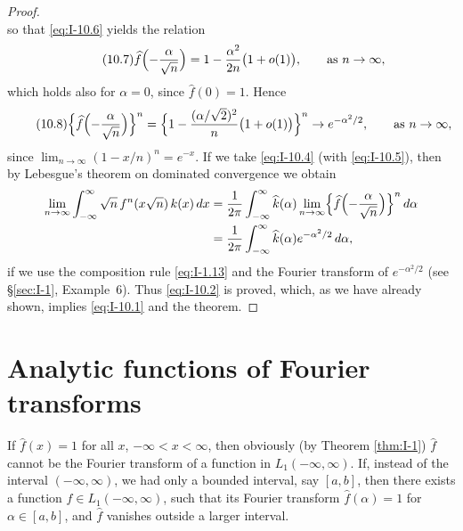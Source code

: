 \begin{proof}
\begin{equation*}
\end{equation*}
so that \eqref{eq:I-10.6} yields the relation
\begin{equation}\label{eq:I-10.7}\tag{10.7}
\widehat f\Bigl(-\frac{\alpha}{\sqrt n}\Bigr)
=1-\frac{\alpha^{2}}{2n}\bigl(1+o(1)\bigr),\qquad\text{as }n\to\infty,
\end{equation}
which holds also for $\alpha=0$, since $\widehat f(0)=1$. Hence
\begin{equation}\label{eq:I-10.8}\tag{10.8}
\Bigl\{\widehat f\Bigl(-\frac{\alpha}{\sqrt n}\Bigr)\Bigr\}^n
=\Bigl\{1-\frac{(\alpha/\sqrt2)^{2}}{n}\bigl(1+o(1)\bigr)\Bigr\}^n
\to e^{-\alpha^{2}/2},\qquad\text{as }n\to\infty,
\end{equation}
since $\lim_{n\to\infty}(1-x/n)^n=e^{-x}$. If we take \eqref{eq:I-10.4} (with \eqref{eq:I-10.5}), then by Lebesgue's theorem on dominated convergence we obtain
\begin{equation*}
\begin{aligned}
\lim_{n\to\infty}\int_{-\infty}^{\infty}\sqrt n\,f^n(x\sqrt n)\,k(x)\,dx &= \frac{1}{2\pi}\int_{-\infty}^{\infty}\widehat k(\alpha)\lim_{n\to\infty}\Bigl\{\widehat f\Bigl(-\frac{\alpha}{\sqrt n}\Bigr)\Bigr\}^n\,d\alpha\\
&= \frac{1}{2\pi}\int_{-\infty}^{\infty}\widehat k(\alpha)e^{-\alpha^{2}/2}\,d\alpha,
\end{aligned}
\end{equation*}
if we use the composition rule \eqref{eq:I-1.13} and the Fourier transform of $e^{-\alpha^{2}/2}$ (see \S\ref{sec:I-1}, Example~6). Thus \eqref{eq:I-10.2} is proved, which, as we have already shown, implies \eqref{eq:I-10.1} and the theorem.
\end{proof}

\section{Analytic functions of Fourier transforms}
\label{sec:I-11}

If $\widehat f(x)=1$ for all $x$, $-\infty<x<\infty$, then obviously (by Theorem \ref{thm:I-1}) $\widehat f$ cannot be the Fourier transform of a function in $L_1(-\infty,\infty)$. If, instead of the interval $(-\infty,\infty)$, we had only a bounded interval, say $[a,b]$, then there exists a function $f\in L_1(-\infty,\infty)$, such that its Fourier transform $\widehat f(\alpha)=1$ for $\alpha\in[a,b]$, and $\widehat f$ vanishes outside a larger interval.

